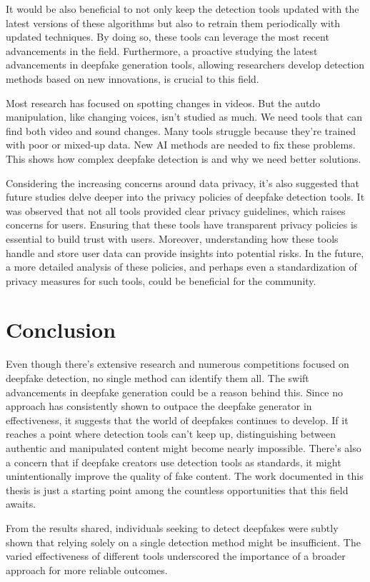 It would be also beneficial to not only keep the
detection tools updated with the latest versions of these algorithms but also to
retrain them periodically with updated techniques. By doing so, these tools can
leverage the most recent advancements in the field. Furthermore, a proactive studying the
latest advancements in deepfake generation tools, allowing researchers develop detection
methods based on new innovations, is crucial to this field.

Most research has focused on spotting changes in videos. But the autdo manipulation,
like changing voices, isn't studied as much. We need tools that can find both video
and sound changes. Many tools struggle because they're trained with poor or mixed-up
data. New \ac{AI} methods are needed to fix these problems. This shows how complex
deepfake detection is and why we need better solutions.

Considering the increasing concerns around data privacy, it's also suggested that future
studies delve deeper into the privacy policies of deepfake detection tools. It was
observed that not all tools provided clear privacy guidelines, which raises concerns
for users. Ensuring that these tools have transparent privacy policies is essential to
build trust with users. Moreover, understanding how these tools handle and store
user data can provide insights into potential risks. In the future, a more detailed
analysis of these policies, and perhaps even a standardization of privacy measures
for such tools, could be beneficial for the community.

\section{Conclusion}
Even though there's extensive research and numerous competitions focused on deepfake
detection, no single method can identify them all. The swift advancements in
deepfake generation could be a reason behind this. Since no approach has consistently
shown to outpace the deepfake generator in effectiveness, it suggests that the world
of deepfakes continues to develop. If it reaches a point where detection tools can't
keep up, distinguishing between authentic and manipulated content might become
nearly impossible. There's also a concern that if deepfake creators use detection
tools as standards, it might unintentionally improve the quality of fake content.
The work documented in this thesis is just a starting point among the countless
opportunities that this field awaits.


From the results shared, individuals seeking to detect deepfakes were subtly shown
that relying solely on a single detection method might be insufficient. The varied
effectiveness of different tools underscored the importance of a broader approach
for more reliable outcomes.
